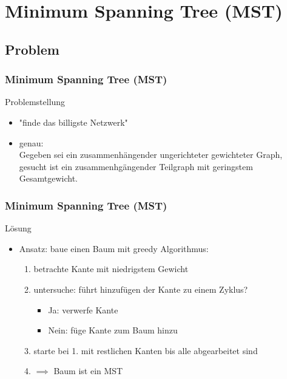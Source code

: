 \section{Minimum Spanning Tree (MST)}

\subsection{Problem}


\begin{frame}
\frametitle{Minimum Spanning Tree (MST)}
\begin{block}{Problemstellung}
\begin{itemize}
\item "finde das billigste Netzwerk"
\item genau: \\
Gegeben sei ein zusammenhängender ungerichteter gewichteter Graph, gesucht ist ein zusammenhgängender Teilgraph mit geringstem Gesamtgewicht.
\end{itemize}
\end{block}

\end{frame}

\begin{frame}
\frametitle{Minimum Spanning Tree (MST)}
\begin{block}{Lösung}
\begin{itemize}
\item Ansatz: baue einen Baum mit greedy Algorithmus:
\begin{enumerate}
\item betrachte Kante mit niedrigstem Gewicht
\item untersuche: führt hinzufügen der Kante zu einem Zyklus?
\begin{itemize}
\item Ja: verwerfe Kante
\item Nein: füge Kante zum Baum hinzu
\end{itemize}
\item starte bei 1. mit restlichen Kanten bis alle abgearbeitet sind
\item $ \implies $ Baum ist ein MST
\end{enumerate}
\end{itemize}
\end{block}

\end{frame}

